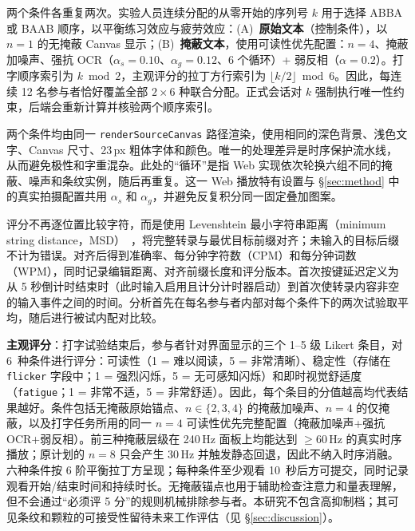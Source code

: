 \documentclass{ieeeaccess}
\begin{document}
{两个条件各重复两次。实验人员连续分配的从零开始的序列号 $k$ 用于选择 ABBA 或 BAAB 顺序，以平衡练习效应与疲劳效应：(A)~\textbf{原始文本}（控制条件），以 $n=1$ 的无掩蔽 Canvas 显示；(B)~\textbf{掩蔽文本}，使用可读性优先配置：$n=4$、掩蔽加噪声、强抗 OCR（$\alpha_s=0.10$、$\alpha_g=0.12$、6 个循环）+ 弱反相（$\alpha=0.2$）。打字顺序索引为 $k\bmod2$，主观评分的拉丁方行索引为 $\lfloor k/2\rfloor\bmod6$。因此，每连续 12 名参与者恰好覆盖全部 $2\times6$ 种联合分配。正式会话对 $k$ 强制执行唯一性约束，后端会重新计算并核验两个顺序索引。

两个条件均由同一 \texttt{render\allowbreak Source\allowbreak Canvas} 路径渲染，使用相同的深色背景、浅色文字、Canvas 尺寸、23\,px 粗体字体和颜色。唯一的处理差异是时序保护流水线，从而避免极性和字重混杂。此处的“循环”是指 Web 实现依次轮换六组不同的掩蔽、噪声和条纹实例，随后再重复。这一 Web 播放特有设置与 \S\ref{sec:method} 中的真实拍摄配置共用 $\alpha_s$ 和 $\alpha_g$，并避免反复积分同一固定叠加图案。

评分不再逐位置比较字符，而是使用 Levenshtein 最小字符串距离（minimum string distance，MSD）~\cite{b_soukoreff2003}，将完整转录与最优目标前缀对齐；未输入的目标后缀不计为错误。对齐后得到准确率、每分钟字符数（CPM）和每分钟词数（WPM），同时记录编辑距离、对齐前缀长度和评分版本。首次按键延迟定义为从 5 秒倒计时结束时（此时输入启用且计分计时器启动）到首次使转录内容非空的输入事件之间的时间。分析首先在每名参与者内部对每个条件下的两次试验取平均，随后进行被试内配对比较。

\textbf{主观评分}：打字试验结束后，参与者针对界面显示的三个 1--5 级 Likert 条目，对 6~种条件进行评分：可读性（1 = 难以阅读，5 = 非常清晰）、稳定性（存储在 \texttt{flicker} 字段中；1 = 强烈闪烁，5 = 无可感知闪烁）和即时视觉舒适度（\texttt{fatigue}；1 = 非常不适，5 = 非常舒适）。因此，每个条目的分值越高均代表结果越好。条件包括无掩蔽原始锚点、$n\in\{2,3,4\}$ 的掩蔽加噪声、$n=4$ 的仅掩蔽，以及打字任务所用的同一 $n=4$ 可读性优先完整配置（掩蔽加噪声+强抗 OCR+弱反相）。前三种掩蔽层级在 240\,Hz 面板上均能达到 $\geq$60\,Hz 的真实时序播放；原计划的 $n=8$ 只会产生 30\,Hz 并触发静态回退，因此不纳入时序消融。六种条件按 6 阶平衡拉丁方呈现；每种条件至少观看 10~秒后方可提交，同时记录观看开始/结束时间和持续时长。无掩蔽锚点也用于辅助检查注意力和量表理解，但不会通过“必须评 5 分”的规则机械排除参与者。本研究不包含高抑制档；其可见条纹和颗粒的可接受性留待未来工作评估（见 \S\ref{sec:discussion}）。

}
\end{document}
